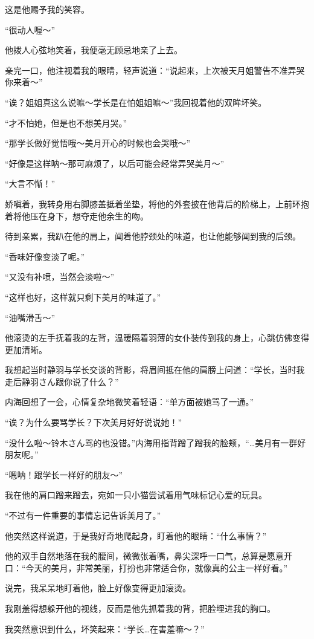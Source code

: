这是他赐予我的笑容。

“很动人喔～”

他拨人心弦地笑着，我便毫无顾忌地亲了上去。

亲完一口，他注视着我的眼睛，轻声说道：“说起来，上次被天月姐警告不准弄哭你来着～”

“诶？姐姐真这么说嘛～学长是在怕姐姐嘛～”我回视着他的双眸坏笑。

“才不怕她，但是也不想美月哭。”

“那学长做好觉悟哦～美月开心的时候也会哭哦～”

“好像是这样呐～那可麻烦了，以后可能会经常弄哭美月～”

“大言不惭！”

娇嗔着，我转身用右脚膝盖抵着坐垫，将他的外套披在他背后的阶梯上，上前环抱着将他压在身下，想夺走他余生的吻。

待到亲累，我趴在他的肩上，闻着他脖颈处的味道，也让他能够闻到我的后颈。

“香味好像变淡了呢。”

“又没有补喷，当然会淡啦～”

“这样也好，这样就只剩下美月的味道了。”

“油嘴滑舌～”

他滚烫的左手抚着我的左背，温暖隔着羽薄的女仆装传到我的身上，心跳仿佛变得更加清晰。

我想起当时静羽与学长交谈的背影，将眉间抵在他的肩膀上问道：“学长，当时我走后静羽さん跟你说了什么？”


内海回想了一会，心情复杂地微笑着轻语：“单方面被她骂了一通。”

“诶？为什么要骂学长？下次美月好好说说她！”

“没什么啦～铃木さん骂的也没错。”内海用指背蹭了蹭我的脸颊，“…美月有一群好朋友呢。”

“嗯呐！跟学长一样好的朋友～”

我在他的肩口蹭来蹭去，宛如一只小猫尝试着用气味标记心爱的玩具。

“不过有一件重要的事情忘记告诉美月了。”

他突然这样说道，于是我好奇地爬起身，盯着他的眼睛：“什么事情？”

他的双手自然地落在我的腰间，微微张着嘴，鼻尖深呼一口气，总算是愿意开口：“今天的美月，非常美丽，打扮也非常适合你，就像真的公主一样好看。”

说完，我呆呆地盯着他，脸上好像变得更加滚烫。

我刚羞得想躲开他的视线，反而是他先抓着我的背，把脸埋进我的胸口。

我突然意识到什么，坏笑起来：“学长…在害羞嘛～？”

